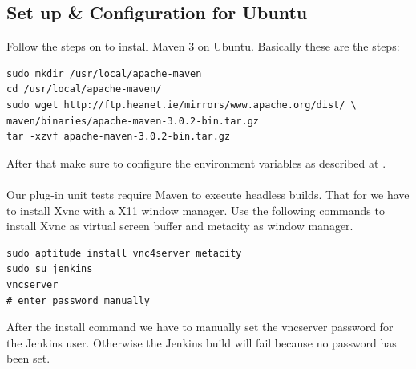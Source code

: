 \documentclass[11pt,a4paper,oneside]{scrreprt}
\begin{document}
\subsection{Set up \& Configuration for Ubuntu}
Follow the steps on \cite{mavenubuntusetup} to install Maven 3 on Ubuntu. Basically these are the steps:

\begin{lstlisting}[style=console, caption=Maven set up commands]
sudo mkdir /usr/local/apache-maven
cd /usr/local/apache-maven/
sudo wget http://ftp.heanet.ie/mirrors/www.apache.org/dist/ \
maven/binaries/apache-maven-3.0.2-bin.tar.gz
tar -xzvf apache-maven-3.0.2-bin.tar.gz
\end{lstlisting}

After that make sure to configure the environment variables as described at \cite{mavenubuntusetup}.
\\\\
Our plug-in unit tests require Maven to execute headless builds. That for we have to install Xvnc with a X11 window manager. Use the following commands to install Xvnc as virtual screen buffer and metacity as window manager.

\begin{lstlisting}[style=console, caption=Set up xvnc]
sudo aptitude install vnc4server metacity
sudo su jenkins
vncserver
# enter password manually
\end{lstlisting}

After the install command we have to manually set the vncserver password for the Jenkins user. Otherwise the Jenkins build will fail because no password has been set.
\end{document}
